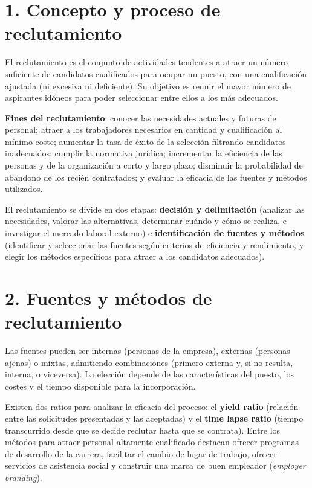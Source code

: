 \documentclass[12pt]{book} %
\begin{document}
\hypertarget{concepto-y-proceso-de-reclutamiento}{%
\section{1. Concepto y proceso de
reclutamiento}\label{concepto-y-proceso-de-reclutamiento}}

El reclutamiento es el conjunto de actividades tendentes a atraer un
número suficiente de candidatos cualificados para ocupar un puesto, con
una cualificación ajustada (ni excesiva ni deficiente). Su objetivo es
reunir el mayor número de aspirantes idóneos para poder seleccionar
entre ellos a los más adecuados.

\textbf{Fines del reclutamiento}: conocer las necesidades actuales y
futuras de personal; atraer a los trabajadores necesarios en cantidad y
cualificación al mínimo coste; aumentar la tasa de éxito de la selección
filtrando candidatos inadecuados; cumplir la normativa jurídica;
incrementar la eficiencia de las personas y de la organización a corto y
largo plazo; disminuir la probabilidad de abandono de los recién
contratados; y evaluar la eficacia de las fuentes y métodos utilizados.

El reclutamiento se divide en dos etapas: \textbf{decisión y
delimitación} (analizar las necesidades, valorar las alternativas,
determinar cuándo y cómo se realiza, e investigar el mercado laboral
externo) e \textbf{identificación de fuentes y métodos} (identificar y
seleccionar las fuentes según criterios de eficiencia y rendimiento, y
elegir los métodos específicos para atraer a los candidatos adecuados).

\hypertarget{fuentes-y-muxe9todos-de-reclutamiento}{%
\section{2. Fuentes y métodos de
reclutamiento}\label{fuentes-y-muxe9todos-de-reclutamiento}}

Las fuentes pueden ser internas (personas de la empresa), externas
(personas ajenas) o mixtas, admitiendo combinaciones (primero externa y,
si no resulta, interna, o viceversa). La elección depende de las
características del puesto, los costes y el tiempo disponible para la
incorporación.

Existen dos ratios para analizar la eficacia del proceso: el
\textbf{yield ratio} (relación entre las solicitudes presentadas y las
aceptadas) y el \textbf{time lapse ratio} (tiempo transcurrido desde que
se decide reclutar hasta que se contrata). Entre los métodos para atraer
personal altamente cualificado destacan ofrecer programas de desarrollo
de la carrera, facilitar el cambio de lugar de trabajo, ofrecer
servicios de asistencia social y construir una marca de buen empleador
(\emph{employer branding}).
\end{document}
